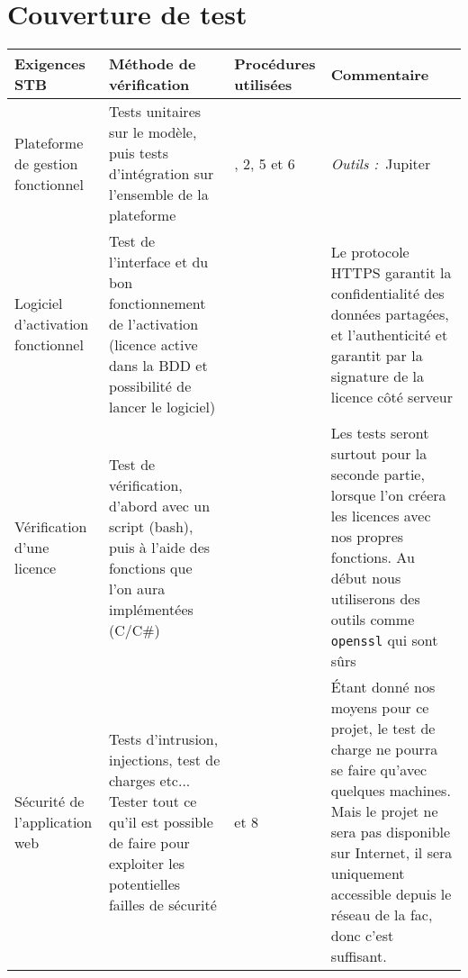 \chapter{Couverture de test}

\begin{table}[!h]
    \centering
    \vspace{-0.3cm}
    \begin{tabular}{| >{\raggedright\arraybackslash}m{}
                    | >{\raggedright\arraybackslash}m{}
                    | >{\raggedright\arraybackslash}m{}
                    | >{\raggedright\arraybackslash}m{} |}
        \hline
            \textbf{Exigences STB} & \textbf{Méthode de vérification} & \textbf{Procédures utilisées} & \textbf{Commentaire} \\
        \hline
            Plateforme de gestion fonctionnel
            & Tests unitaires sur le modèle, puis tests d'intégration sur l'ensemble de la
            plateforme
            & 1, 2, 5 et 6
            & \emph{Outils :} Jupiter \\
        \hline
            Logiciel d'activation fonctionnel
            & Test de l'interface et du bon fonctionnement de l'activation (licence active dans
            la BDD et possibilité de lancer le logiciel)
            & 3
            & Le protocole HTTPS garantit la confidentialité des données partagées, et
            l'authenticité et garantit par la signature de la licence côté serveur \\
        \hline
            Vérification d'une licence
            & Test de vérification, d'abord avec un script (bash), puis à l'aide des fonctions
            que l'on aura implémentées (C/C\#)
            & 4
            & Les tests seront surtout pour la seconde partie, lorsque l'on créera les licences
            avec nos propres fonctions. Au début nous utiliserons des outils comme \verb:openssl:
            qui sont sûrs \\
        \hline
            Sécurité de l'application web
            & Tests d'intrusion, injections, test de charges etc... Tester tout ce qu'il est
            possible de faire pour exploiter les potentielles failles de sécurité
            & 7 et 8
            & Étant donné nos moyens pour ce projet, le test de charge ne pourra se faire
            qu'avec quelques machines. Mais le projet ne sera pas disponible sur Internet,
            il sera uniquement accessible depuis le réseau de la fac, donc c'est suffisant. \\

\end{tabular}
\end{table}
